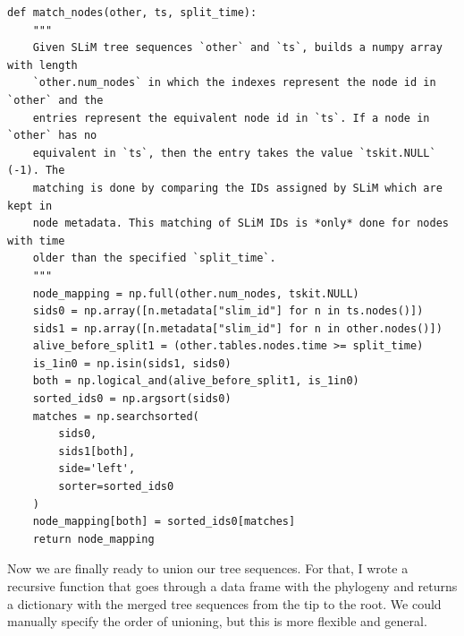 \documentclass[12pt]{article}
\begin{document}
\begin{listing}
    \begin{verbatim}
def match_nodes(other, ts, split_time):
    """
    Given SLiM tree sequences `other` and `ts`, builds a numpy array with length
    `other.num_nodes` in which the indexes represent the node id in `other` and the
    entries represent the equivalent node id in `ts`. If a node in `other` has no
    equivalent in `ts`, then the entry takes the value `tskit.NULL` (-1). The
    matching is done by comparing the IDs assigned by SLiM which are kept in
    node metadata. This matching of SLiM IDs is *only* done for nodes with time
    older than the specified `split_time`.
    """
    node_mapping = np.full(other.num_nodes, tskit.NULL)
    sids0 = np.array([n.metadata["slim_id"] for n in ts.nodes()])
    sids1 = np.array([n.metadata["slim_id"] for n in other.nodes()])
    alive_before_split1 = (other.tables.nodes.time >= split_time)
    is_1in0 = np.isin(sids1, sids0)
    both = np.logical_and(alive_before_split1, is_1in0)
    sorted_ids0 = np.argsort(sids0)
    matches = np.searchsorted(
        sids0,
        sids1[both],
        side='left',
        sorter=sorted_ids0
    )
    node_mapping[both] = sorted_ids0[matches]
    return node_mapping
    \end{verbatim}
\end{listing}

Now we are finally ready to union our tree sequences.
For that, I wrote a recursive function that goes through a data frame with the phylogeny
and returns a dictionary with the merged tree sequences from the tip to the root.
We could manually specify the order of unioning, but this is more flexible and general.
\end{document}
